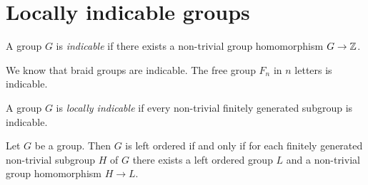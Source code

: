 
\section{Locally indicable groups}
\label{section:LI}

\begin{definition}
    A group $G$ is \emph{indicable} if
    there exists a non-trivial group homomorphism $G\to\mathbb{Z}$.
\end{definition}

We know that braid groups are indicable.
The free group $F_n$ in $n$ letters is indicable. 

\begin{definition}
    A group $G$ is \emph{locally indicable} if every 
    non-trivial finitely generated subgroup is indicable.
\end{definition}


\begin{theorem}
\label{thm:BurnsHale}
Let $G$ be a group. Then $G$ is left ordered if and only if for each finitely generated non-trivial subgroup $H$ of $G$ there exists a left ordered group $L$ 
and a non-trivial group homomorphism $H\to L$.  
\end{theorem}

